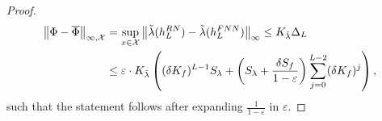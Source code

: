 \documentclass[10pt,a4paper]{amsart}
\newcommand{\eps}{\varepsilon}
\newcommand\norm[1]{\left\lVert#1\right\rVert}
\begin{document}
\begin{proof}
    \begin{align}
        \norm{\Phi - \overline{\Phi}}_{\infty,\mathcal{X}} &= \sup_{x \in \mathcal{X}}\norm{\tilde{\lambda}(h_L^{\textup{RN}}) - \tilde{\lambda}(h_L^{\textup{FNN}})}_\infty 
        \leq K_{\tilde{\lambda}} \Delta_L \nonumber \\
        &\leq \eps \cdot K_{\tilde{\lambda}}\left( (\delta K_f)^{L-1} S_\lambda +  \left(S_\lambda  + \frac{\delta S_f}{1-\eps}\right) \sum_{j = 0}^{L-2} (\delta K_f)^j\right),  \label{eq:explicit_bound} 
    \end{align}
    such that the statement follows after expanding $\frac{1}{1-\eps}$ in $\eps$.
\end{proof}
\end{document}
